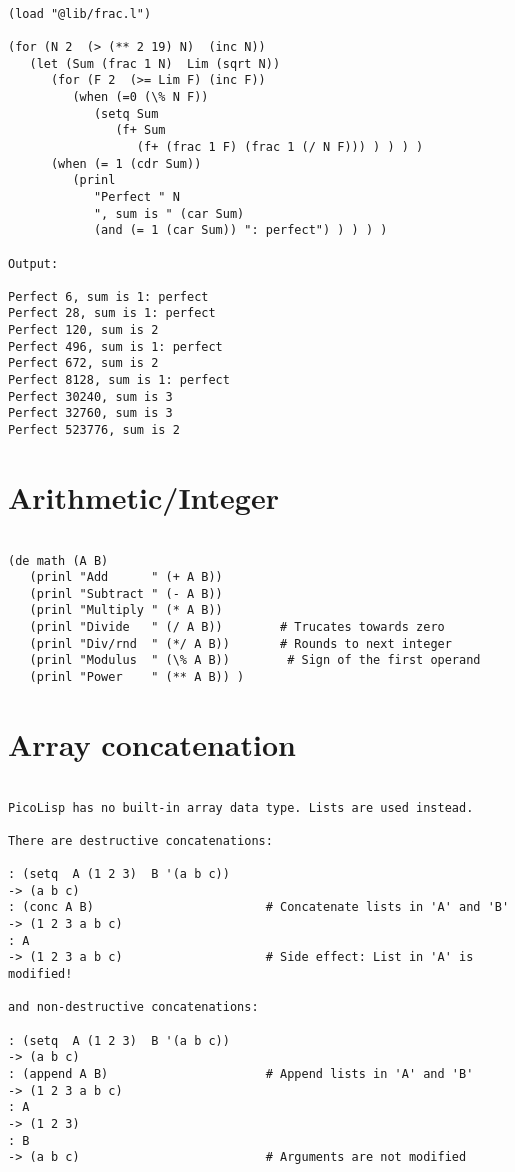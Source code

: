 \begin{verbatim}

(load "@lib/frac.l")

(for (N 2  (> (** 2 19) N)  (inc N))
   (let (Sum (frac 1 N)  Lim (sqrt N))
      (for (F 2  (>= Lim F) (inc F))
         (when (=0 (\% N F))
            (setq Sum
               (f+ Sum
                  (f+ (frac 1 F) (frac 1 (/ N F))) ) ) ) )
      (when (= 1 (cdr Sum))
         (prinl
            "Perfect " N
            ", sum is " (car Sum)
            (and (= 1 (car Sum)) ": perfect") ) ) ) )

Output:

Perfect 6, sum is 1: perfect
Perfect 28, sum is 1: perfect
Perfect 120, sum is 2
Perfect 496, sum is 1: perfect
Perfect 672, sum is 2
Perfect 8128, sum is 1: perfect
Perfect 30240, sum is 3
Perfect 32760, sum is 3
Perfect 523776, sum is 2
\end{verbatim}

\section*{Arithmetic/Integer}

\begin{verbatim}

(de math (A B)
   (prinl "Add      " (+ A B))
   (prinl "Subtract " (- A B))
   (prinl "Multiply " (* A B))
   (prinl "Divide   " (/ A B))        # Trucates towards zero
   (prinl "Div/rnd  " (*/ A B))       # Rounds to next integer
   (prinl "Modulus  " (\% A B))        # Sign of the first operand
   (prinl "Power    " (** A B)) )

\end{verbatim}

\section*{Array concatenation}

\begin{verbatim}

PicoLisp has no built-in array data type. Lists are used instead.

There are destructive concatenations:

: (setq  A (1 2 3)  B '(a b c))
-> (a b c)
: (conc A B)                        # Concatenate lists in 'A' and 'B'
-> (1 2 3 a b c)
: A
-> (1 2 3 a b c)                    # Side effect: List in 'A' is modified!

and non-destructive concatenations:

: (setq  A (1 2 3)  B '(a b c))
-> (a b c)
: (append A B)                      # Append lists in 'A' and 'B'
-> (1 2 3 a b c)
: A
-> (1 2 3)
: B
-> (a b c)                          # Arguments are not modified

\end{verbatim}

